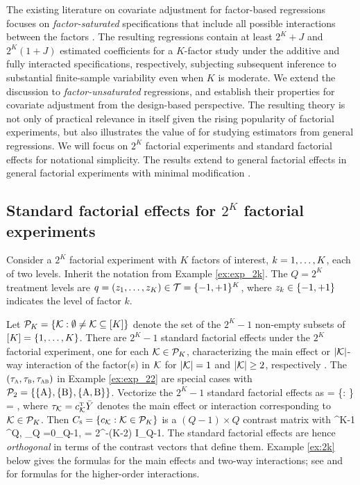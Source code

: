\documentclass[11pt]{article}
\theoremstyle{definition}
\begin{document}
The existing literature on covariate adjustment for factor-based regressions focuses on {\it factor-saturated} specifications that include all possible interactions between the factors \citep{lu16bFact, lu2016covariate, ZDb}. The resulting regressions contain at least $2^K + J$ and $2^K(1+J)$ estimated coefficients for a $K$-factor study under the additive and fully interacted specifications, respectively, subjecting subsequent inference to substantial finite-sample variability even when $K$ is moderate.  
We extend the discussion to {\it factor-unsaturated} regressions, and establish their properties for covariate adjustment from the design-based perspective. 
The resulting theory is not only of practical relevance in itself given the rising popularity of factorial experiments, but also illustrates the value of \rolss for studying estimators from general \olss regressions.
We will focus on $2^K$ factorial experiments and standard factorial effects for notational simplicity. 
The results extend to general factorial effects in general factorial experiments with minimal modification \citep[][Section A]{ZDa}. 



\subsection{Standard factorial effects for $2^K$ factorial experiments}
Consider a $2^K$ factorial experiment with $K$ factors of interest, $k = 1, \ldots,K$, each of two levels. 
Inherit the notation from Example \ref{ex:exp_2k}.
The $Q = 2^K$ treatment levels are $q = (z_1,\dots, z_K) \in \mathcal{T} = \{-1, +1\} ^K$, where $z_k \in \{-1, +1\} $ indicates the level of factor $k$. 

Let $\mathcal P_K = \{\mathcal{K}: \emptyset \neq \mathcal{K} \subseteq [K]\}$ denote the set of the $2^K-1$ non-empty subsets of $[K]= \{1, \ldots,K\}$. 
There are $2^K - 1$ standard factorial effects under the $2^K$ factorial experiment, one for each $\mathcal{K} \in \mathcal P_K$, 
characterizing the main effect or $|\mathcal{K}|$-way interaction of the factor(s) in $\mathcal{K}$ for $|\mathcal{K}| =1$ and  $|\mathcal{K}| \geq 2$, respectively \citep{wh, DasFact15}. 
The $(\tau_{\textsc{a}}, \tau_{\textsc{b}}, \tau_{\textsc{ab}})$ in Example \ref{ex:exp_22} are special cases with $\mathcal P_2 = \{ \{\textup{A}\}, \{\textup{B}\}, \{\textup{A}, \textup{B}\}\}$. Vectorize the $2^K-1$ standard factorial effects as
\begina
\ts = \{\tsmk: \mk \in\pk\} = \cs\by , 
\enda
where $ \tau_{\mathcal{K}} = c_{\mathcal{K}}^{ \mathrm{\scriptscriptstyle T} }\bar Y$ denotes the main effect or interaction corresponding to $\mathcal{K}\in\mathcal P_K$.  
Then $C_{\textsc{s}} = \{c_{\mathcal{K}}: \mathcal{K} \in \mathcal P_K\}$ is a $(Q-1)\times Q$ contrast matrix with 
^{K-1} \csk \in \pmo^Q,  \qquad {}_Q =0_{Q-1}, \qquad \cs \cst = 2^{-(K-2)} I_{Q-1}. 
\enda 
The standard factorial effects are hence {\it orthogonal} in terms of the contrast vectors that define them. 
Example \ref{ex:2k} below gives the formulas for the main effects and two-way interactions;
see \cite{DasFact15} and \citet{AOS} for formulas for the higher-order interactions. 
\end{document}
